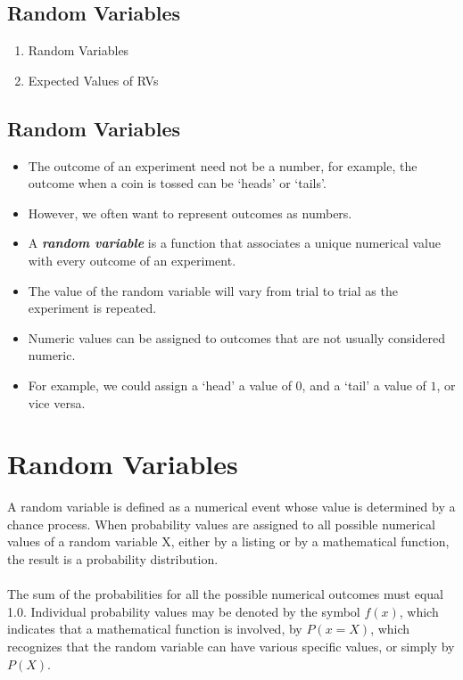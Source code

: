 \documentclass[]{report}
\begin{document}
\subsection{Random Variables}
\begin{enumerate}
\item Random Variables
\item Expected Values of RVs
\end{enumerate}






\subsection{Random Variables}
\begin{itemize} \item The outcome of an experiment need not be a number, for example, the outcome when a coin is tossed can be `heads' or `tails'. \item
However, we often want to represent outcomes as numbers. \item
A \textbf{\emph{random variable}} is a function that associates a unique numerical value with every outcome of an experiment.
\item The value of the random variable will vary from trial to trial as the experiment is repeated.
\item Numeric values can be assigned to outcomes that are not usually considered numeric. \item For example, we could assign a `head' a value of $0$, and a `tail' a value of $1$, or vice versa.
\end{itemize}




\section{Random Variables}
A random variable is defined as a numerical event whose value is determined by a chance process.
When probability values are assigned to all possible numerical values of a random variable X, either by a listing
or by a mathematical function, the result is a probability distribution. \\
\\
The sum of the probabilities for all the possible numerical outcomes must equal 1.0. Individual probability values may be denoted by the symbol $f(x)$,
which indicates that a mathematical function is involved, by $P(x = X)$, which recognizes that the random
variable can have various specific values, or simply by $P(X)$.
\end{document}
